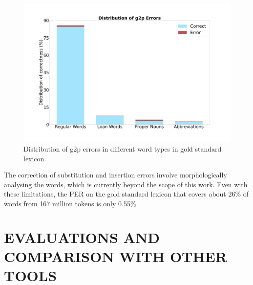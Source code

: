 \documentclass{ieeeaccess}
\begin{document}
\begin{figure}[h]
    \centering
    \includegraphics[width=\linewidth]{g2p-error.jpg}
    \caption{Distribution of g2p errors in different word types in gold standard lexicon.}
    \label{g2p-error}
\end{figure}






The correction of substitution and insertion errors involve morphologically analysing the words, which is currently beyond the scope of this work. Even with these limitations, the PER on the gold standard lexicon that covers about 26\% of words from 167 million tokens is only 0.55\% 



\section{EVALUATIONS AND COMPARISON WITH OTHER TOOLS}
\label{asr}
\end{document}
